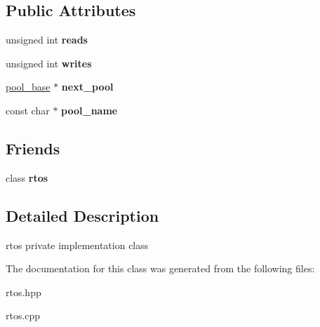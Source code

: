 \subsection*{Public Attributes}
\begin{DoxyCompactItemize}
\item 
unsigned int {\bfseries reads}\hypertarget{classrtos_1_1pool__base_af1d2c0ebc43cdf86eb369d8e181fc2c7}{}\label{classrtos_1_1pool__base_af1d2c0ebc43cdf86eb369d8e181fc2c7}

\item 
unsigned int {\bfseries writes}\hypertarget{classrtos_1_1pool__base_a85103a528d8dac5e40262cc39968a7f6}{}\label{classrtos_1_1pool__base_a85103a528d8dac5e40262cc39968a7f6}

\item 
\hyperlink{classrtos_1_1pool__base}{pool\+\_\+base} $\ast$ {\bfseries next\+\_\+pool}\hypertarget{classrtos_1_1pool__base_a123094ff55fa3f599059a6133168f7cc}{}\label{classrtos_1_1pool__base_a123094ff55fa3f599059a6133168f7cc}

\item 
const char $\ast$ {\bfseries pool\+\_\+name}\hypertarget{classrtos_1_1pool__base_aa546f6f4b86abc5878edaaaf4560ef70}{}\label{classrtos_1_1pool__base_aa546f6f4b86abc5878edaaaf4560ef70}

\end{DoxyCompactItemize}
\subsection*{Friends}
\begin{DoxyCompactItemize}
\item 
class {\bfseries rtos}\hypertarget{classrtos_1_1pool__base_a2a7bcfc34141352757ad672e3ecd099f}{}\label{classrtos_1_1pool__base_a2a7bcfc34141352757ad672e3ecd099f}

\end{DoxyCompactItemize}


\subsection{Detailed Description}
rtos private implementation class 

The documentation for this class was generated from the following files\+:\begin{DoxyCompactItemize}
\item 
rtos.\+hpp\item 
rtos.\+cpp\end{DoxyCompactItemize}
